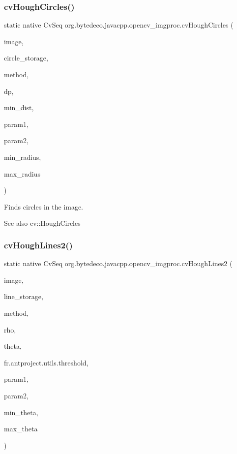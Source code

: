 \subsubsection{\texorpdfstring{cv\+Hough\+Circles()}{cvHoughCircles()}}
{\footnotesize\ttfamily static native Cv\+Seq org.\+bytedeco.\+javacpp.\+opencv\+\_\+imgproc.\+cv\+Hough\+Circles (\begin{DoxyParamCaption}\item[{Cv\+Arr}]{image,  }\item[{Pointer}]{circle\+\_\+storage,  }\item[{int}]{method,  }\item[{double}]{dp,  }\item[{double}]{min\+\_\+dist,  }\item[{double}]{param1,  }\item[{double}]{param2,  }\item[{int}]{min\+\_\+radius,  }\item[{int}]{max\+\_\+radius }\end{DoxyParamCaption})\hspace{0.3cm}{\ttfamily [static]}}



Finds circles in the image. 

\begin{DoxySeeAlso}{See also}
cv\+::\+Hough\+Circles 
\end{DoxySeeAlso}
\mbox{\label{group__imgproc__c_gafc3c62ef34d90e0357c5599049a75b95}} 
\subsubsection{\texorpdfstring{cv\+Hough\+Lines2()}{cvHoughLines2()}}
{\footnotesize\ttfamily static native Cv\+Seq org.\+bytedeco.\+javacpp.\+opencv\+\_\+imgproc.\+cv\+Hough\+Lines2 (\begin{DoxyParamCaption}\item[{Cv\+Arr}]{image,  }\item[{Pointer}]{line\+\_\+storage,  }\item[{int}]{method,  }\item[{double}]{rho,  }\item[{double}]{theta,  }\item[{int}]{fr.antproject.utils.threshold,  }\item[{double}]{param1,  }\item[{double}]{param2,  }\item[{double}]{min\+\_\+theta,  }\item[{double}]{max\+\_\+theta }\end{DoxyParamCaption})\hspace{0.3cm}{\ttfamily [static]}}



